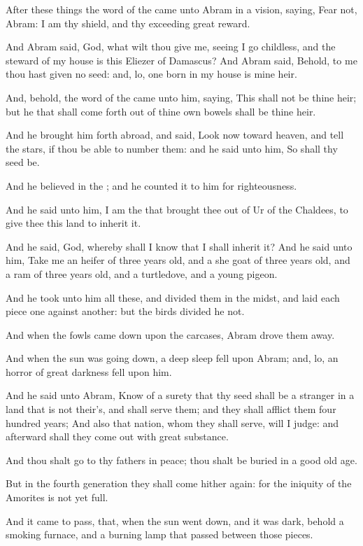 \verse After these things the word of the \LORD came unto Abram in a
vision, saying, Fear not, Abram: I am thy shield, and thy exceeding
great reward.

\verse And Abram said, \LORD God, what wilt thou give me, seeing I go
childless, and the steward of my house is this Eliezer of Damascus?
\verse And Abram said, Behold, to me thou hast given no seed: and, lo,
one born in my house is mine heir.

\verse And, behold, the word of the \LORD came unto him, saying, This
shall not be thine heir; but he that shall come forth out of thine own
bowels shall be thine heir.

\verse And he brought him forth abroad, and said, Look now toward
heaven, and tell the stars, if thou be able to number them: and he
said unto him, So shall thy seed be.

\verse And he believed in the \LORD; and he counted it to him for
righteousness.

\verse And he said unto him, I am the \LORD that brought thee out of Ur
of the Chaldees, to give thee this land to inherit it.

\verse And he said, \LORD God, whereby shall I know that I shall inherit
it?  \verse And he said unto him, Take me an heifer of three years old,
and a she goat of three years old, and a ram of three years old, and a
turtledove, and a young pigeon.

\verse And he took unto him all these, and divided them in the midst,
and laid each piece one against another: but the birds divided he not.

\verse And when the fowls came down upon the carcases, Abram drove them
away.

\verse And when the sun was going down, a deep sleep fell upon Abram;
and, lo, an horror of great darkness fell upon him.

\verse And he said unto Abram, Know of a surety that thy seed shall be
a stranger in a land that is not their's, and shall serve them; and
they shall afflict them four hundred years; \verse And also that
nation, whom they shall serve, will I judge: and afterward shall they
come out with great substance.

\verse And thou shalt go to thy fathers in peace; thou shalt be buried
in a good old age.

\verse But in the fourth generation they shall come hither again: for
the iniquity of the Amorites is not yet full.

\verse And it came to pass, that, when the sun went down, and it was
dark, behold a smoking furnace, and a burning lamp that passed between
those pieces.

